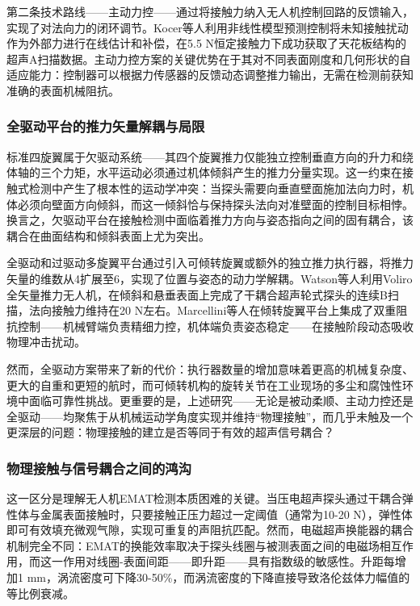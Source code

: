 第二条技术路线——主动力控——通过将接触力纳入无人机控制回路的反馈输入，实现了对法向力的闭环调节。Kocer等人利用非线性模型预测控制将未知接触扰动作为外部力进行在线估计和补偿，在5.5 N恒定接触力下成功获取了天花板结构的超声A扫描数据。主动力控方案的关键优势在于其对不同表面刚度和几何形状的自适应能力：控制器可以根据力传感器的反馈动态调整推力输出，无需在检测前获知准确的表面机械阻抗。

\subsubsection{全驱动平台的推力矢量解耦与局限}

标准四旋翼属于欠驱动系统——其四个旋翼推力仅能独立控制垂直方向的升力和绕体轴的三个力矩，水平运动必须通过机体倾斜产生的推力分量实现。这一约束在接触式检测中产生了根本性的运动学冲突：当探头需要向垂直壁面施加法向力时，机体必须向壁面方向倾斜，而这一倾斜恰与保持探头法向对准壁面的控制目标相悖。换言之，欠驱动平台在接触检测中面临着推力方向与姿态指向之间的固有耦合，该耦合在曲面结构和倾斜表面上尤为突出。

全驱动和过驱动多旋翼平台通过引入可倾转旋翼或额外的独立推力执行器，将推力矢量的维数从4扩展至6，实现了位置与姿态的动力学解耦。Watson等人利用Voliro全矢量推力无人机，在倾斜和悬垂表面上完成了干耦合超声轮式探头的连续B扫描，法向接触力维持在20 N左右。Marcellini等人在倾转旋翼平台上集成了双重阻抗控制——机械臂端负责精细力控，机体端负责姿态稳定——在接触阶段动态吸收物理冲击扰动。

然而，全驱动方案带来了新的代价：执行器数量的增加意味着更高的机械复杂度、更大的自重和更短的航时，而可倾转机构的旋转关节在工业现场的多尘和腐蚀性环境中面临可靠性挑战。更重要的是，上述研究——无论是被动柔顺、主动力控还是全驱动——均聚焦于从机械运动学角度实现并维持“物理接触”，而几乎未触及一个更深层的问题：物理接触的建立是否等同于有效的超声信号耦合？

\subsubsection{物理接触与信号耦合之间的鸿沟}

这一区分是理解无人机EMAT检测本质困难的关键。当压电超声探头通过干耦合弹性体与金属表面接触时，只要接触正压力超过一定阈值（通常为10-20 N），弹性体即可有效填充微观气隙，实现可重复的声阻抗匹配。然而，电磁超声换能器的耦合机制完全不同：EMAT的换能效率取决于探头线圈与被测表面之间的电磁场相互作用，而这一作用对线圈-表面间距——即升距——具有指数级的敏感性。升距每增加1 mm，涡流密度可下降30-50\%，而涡流密度的下降直接导致洛伦兹体力幅值的等比例衰减。

